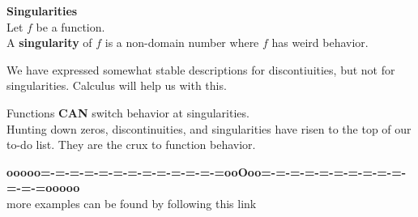 \documentclass{ximera}
\begin{document}
\begin{template}  \textbf{\textcolor{blue!55!black}{Singularities}}  \\

Let $f$ be a function. \\

A \textbf{\textcolor{green!50!black}{singularity}} of $f$ is a non-domain number where $f$ has weird behavior.



\begin{explanation}

We have expressed somewhat stable descriptions for discontiuities, but not for singularities.  Calculus will help us with this.
\end{explanation}


\end{template}

Functions \textbf{\textcolor{red!80!black}{CAN}} switch behavior at singularities. \\




Hunting down zeros, discontinuities, and singularities have risen to the top of our to-do list.  They are the crux to function behavior. \\













\begin{center}
\textbf{\textcolor{green!50!black}{ooooo=-=-=-=-=-=-=-=-=-=-=-=-=ooOoo=-=-=-=-=-=-=-=-=-=-=-=-=ooooo}} \\

more examples can be found by following this link\\ 

\end{center}
\end{document}
